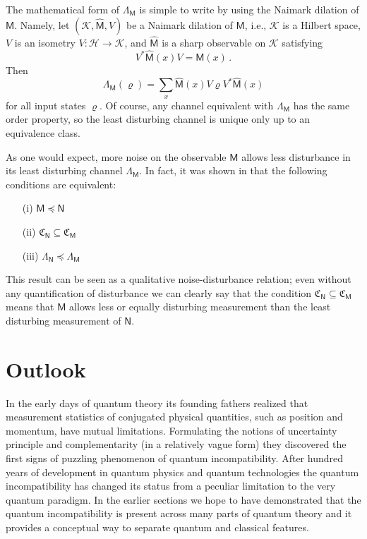 \documentclass[12pt]{article}
\theoremstyle{definition}
\newcommand{\hi}{\mathcal{H}} %
\newcommand{\hik}{\mathcal{K}} %
\newcommand{\Mo}{\mathsf{M}}%
\newcommand{\No}{\mathsf{N}}%
\newcommand{\ch}[1]{\mathfrak{C}_{#1}}
\newcommand{\pleq}{\preceq}
\begin{document}
{The mathematical form of  $\Lambda_\Mo$ is simple to write by using the Naimark dilation of $\Mo$. 
Namely, let $(\hik,\hat{\Mo},V)$ be a Naimark dilation of $\Mo$, i.e., $\hik$ is a Hilbert space, $V$ is an isometry 
$V: \hi \to \hik$, and $\hat{\Mo}$ is a sharp observable  
on $\hik$ satisfying 
\begin{equation}
V^*\hat{\Mo}(x)V = \Mo(x) \, .
\end{equation}
Then
\begin{equation}
\Lambda_\Mo(\varrho) = \sum_x \hat{\Mo}(x) V \varrho V^* \hat{\Mo}(x)
\end{equation}
for all input states $\varrho$.
Of course, any channel equivalent with $\Lambda_\Mo$ has the same order property, so the least disturbing channel is unique only up to an equivalence class. 

As one would expect, more noise on the observable $\Mo$ allows less disturbance in its least disturbing channel $\Lambda_\Mo$.
In fact, it was shown in \cite{HeMi13} that the following conditions are equivalent:
\begin{itemize}
\item[(i)] $\Mo\pleq\No$ 
\item[(ii)] $\ch{\No}\subseteq\ch{\Mo}$
\item[(iii)] $\Lambda_\No \pleq \Lambda_\Mo$
\end{itemize}
This result can be seen as a qualitative noise-disturbance relation; even without any quantification of disturbance we can clearly say that the condition $\ch{\No}\subseteq\ch{\Mo}$
 means that $\Mo$ allows less or equally disturbing measurement than the least disturbing measurement of $\No$.

\section{Outlook}\label{sec:outlook}

In the early days of quantum theory its founding fathers
realized that measurement statistics of conjugated physical quantities, such as position and momentum, have mutual limitations. 
Formulating the notions of uncertainty principle and complementarity (in a relatively vague form) they discovered the first signs of puzzling phenomenon of quantum incompatibility. 
After hundred years of development in quantum physics and quantum 
technologies the quantum incompatibility has changed its status from a peculiar limitation to the very quantum paradigm. 
In the earlier sections we hope to have demonstrated that the quantum incompatibility is present across many parts of quantum theory and it provides a conceptual way to separate quantum and classical features. 

}
\end{document}
